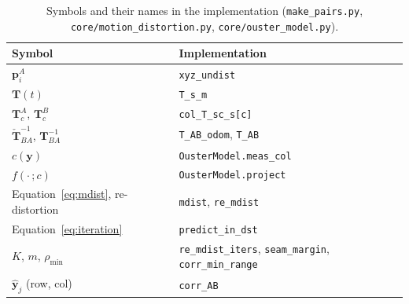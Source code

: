 \begin{table}[h]
\centering
\caption{Symbols and their names in the implementation (\texttt{make\_pairs.py}, \texttt{core/motion\_distortion.py}, \texttt{core/ouster\_model.py}).}
\label{tab:pixel_match_symbols}
\footnotesize
\begin{tabular}{ll}
\hline
Symbol & Implementation \\
\hline
$\mathbf{p}_i^{A}$ & \texttt{xyz\_undist} \\
$\mathbf{T}(t)$ & \texttt{T\_s\_m} \\
$\mathbf{T}^{A}_{c}$, $\mathbf{T}^{B}_{c}$ & \texttt{col\_T\_sc\_s[c]} \\
$\check{\mathbf{T}}_{BA}^{-1}$, $\mathbf{T}_{BA}^{-1}$ & \texttt{T\_AB\_odom}, \texttt{T\_AB} \\
$c(\mathbf{y})$ & \texttt{OusterModel.meas\_col} \\
$f(\cdot\,; c)$ & \texttt{OusterModel.project} \\
Equation~\eqref{eq:mdist}, re-distortion & \texttt{mdist}, \texttt{re\_mdist} \\
Equation~\eqref{eq:iteration} & \texttt{predict\_in\_dst} \\
$K$, $m$, $\rho_{\min}$ & \texttt{re\_mdist\_iters}, \texttt{seam\_margin}, \texttt{corr\_min\_range} \\
$\hat{\mathbf{y}}_j$ (row, col) & \texttt{corr\_AB} \\
\hline
\end{tabular}
\end{table}
